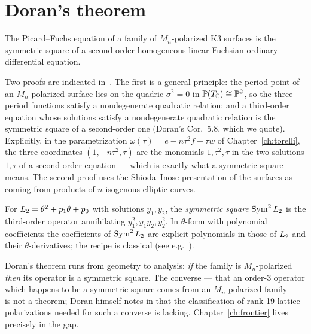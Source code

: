 \section{Doran's theorem}

\begin{theorem}\label{thm:doran}
The Picard--Fuchs equation of a family of $M_n$-polarized K3 surfaces is the
symmetric square of a second-order homogeneous linear Fuchsian ordinary
differential equation.
\end{theorem}

Two proofs are indicated in~\cite{Doran2000}. The first is a general
principle: the period point of an $M_n$-polarized surface lies on the quadric
$\sigma^2=0$ in $\mathbb{P}(T_{\mathbb{C}})\cong\mathbb{P}^2$, so the three period functions satisfy
a nondegenerate quadratic relation; and a third-order equation whose solutions
satisfy a nondegenerate quadratic relation is the symmetric square of a
second-order one (Doran's Cor.~5.8, which we quote). Explicitly, in the
parametrization $\omega(\tau)=e-n\tau^2f+\tau w$ of Chapter~\ref{ch:torelli},
the three coordinates $(1,-n\tau^2,\tau)$ are the monomials $1,\tau^2,\tau$ in
the two solutions $1,\tau$ of a second-order equation --- which is exactly
what a symmetric square means. The second proof uses the Shioda--Inose
presentation of the surfaces as coming from products of $n$-isogenous
elliptic curves.

\begin{definition}
For $L_2=\theta^2+p_1\theta+p_0$ with solutions $y_1,y_2$, the
\emph{symmetric square} $\operatorname{Sym}^2L_2$ is the third-order operator annihilating
$y_1^2,y_1y_2,y_2^2$. In $\theta$-form with polynomial coefficients
the coefficients of $\operatorname{Sym}^2L_2$ are explicit polynomials in those of
$L_2$ and their $\theta$-derivatives; the recipe is classical (see e.g.\
\cite[\S4]{AlmkvistVanStraten2021}).
\end{definition}

\begin{warning}\label{warn:converse}
Doran's theorem runs from geometry to analysis: \emph{if} the family is
$M_n$-polarized \emph{then} its operator is a symmetric square. The converse
--- that an order-3 operator which happens to be a symmetric square comes from
an $M_n$-polarized family --- is not a theorem; Doran himself notes in
\cite[\S6]{Doran2000} that the classification of rank-19 lattice polarizations
needed for such a converse is lacking. Chapter~\ref{ch:frontier} lives
precisely in the gap.
\end{warning}


